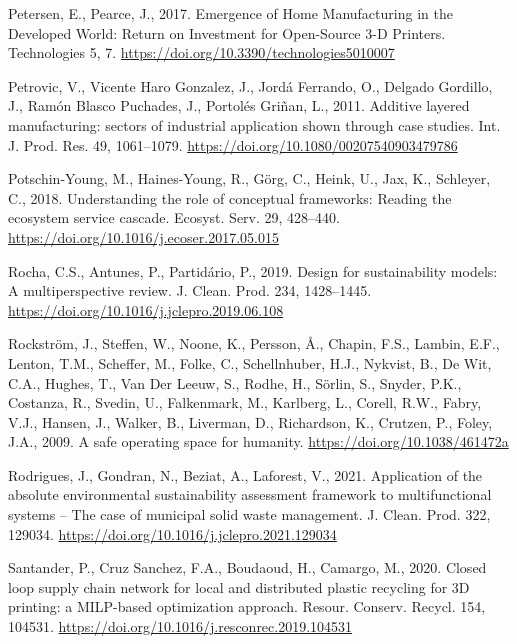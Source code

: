 \documentclass[]{elsarticle} %
\newlength{\cslhangindent}
\newenvironment{CSLReferences}[2] %
 {%
  \setlength{\parindent}{0pt}
  \ifodd #1 \everypar{\setlength{\hangindent}{\cslhangindent}}\ignorespaces\fi
  \ifnum #2 > 0
  \setlength{\parskip}{#2\baselineskip}
  \fi
 }%
 {}
\begin{document}
\begin{CSLReferences}{1}{0}
\leavevmode{}%
Petersen, E., Pearce, J., 2017. {Emergence of Home Manufacturing in the Developed World: Return on Investment for Open-Source 3-D Printers}. Technologies 5, 7. \url{https://doi.org/10.3390/technologies5010007}

\leavevmode{}%
Petrovic, V., Vicente Haro Gonzalez, J., Jordá Ferrando, O., Delgado Gordillo, J., Ramón Blasco Puchades, J., Portolés Griñan, L., 2011. {Additive layered manufacturing: sectors of industrial application shown through case studies}. Int. J. Prod. Res. 49, 1061--1079. \url{https://doi.org/10.1080/00207540903479786}

\leavevmode{}%
Potschin-Young, M., Haines-Young, R., Görg, C., Heink, U., Jax, K., Schleyer, C., 2018. {Understanding the role of conceptual frameworks: Reading the ecosystem service cascade}. Ecosyst. Serv. 29, 428--440. \url{https://doi.org/10.1016/j.ecoser.2017.05.015}

\leavevmode{}%
Rocha, C.S., Antunes, P., Partidário, P., 2019. {Design for sustainability models: A multiperspective review}. J. Clean. Prod. 234, 1428--1445. \url{https://doi.org/10.1016/j.jclepro.2019.06.108}

\leavevmode{}%
Rockström, J., Steffen, W., Noone, K., Persson, Å., Chapin, F.S., Lambin, E.F., Lenton, T.M., Scheffer, M., Folke, C., Schellnhuber, H.J., Nykvist, B., De Wit, C.A., Hughes, T., Van Der Leeuw, S., Rodhe, H., Sörlin, S., Snyder, P.K., Costanza, R., Svedin, U., Falkenmark, M., Karlberg, L., Corell, R.W., Fabry, V.J., Hansen, J., Walker, B., Liverman, D., Richardson, K., Crutzen, P., Foley, J.A., 2009. {A safe operating space for humanity}. \url{https://doi.org/10.1038/461472a}

\leavevmode{}%
Rodrigues, J., Gondran, N., Beziat, A., Laforest, V., 2021. {Application of the absolute environmental sustainability assessment framework to multifunctional systems -- The case of municipal solid waste management}. J. Clean. Prod. 322, 129034. \url{https://doi.org/10.1016/j.jclepro.2021.129034}

\leavevmode{}%
Santander, P., Cruz Sanchez, F.A., Boudaoud, H., Camargo, M., 2020. {Closed loop supply chain network for local and distributed plastic recycling for 3D printing: a MILP-based optimization approach}. Resour. Conserv. Recycl. 154, 104531. \url{https://doi.org/10.1016/j.resconrec.2019.104531}


\end{CSLReferences}
\end{document}
